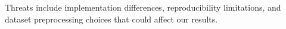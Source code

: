 Threats include implementation differences, reproducibility limitations, and dataset preprocessing choices that could affect our results.
